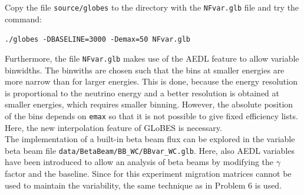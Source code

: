 \documentclass[12pt,a4paper]{article}
\theoremstyle{dotless}
\begin{document}
Copy the file {\tt source/globes} to the directory with the {\tt NFvar.glb} file and try the
command:
\begin{center}
{\tt ./globes -DBASELINE=3000 -Demax=50 NFvar.glb}
\end{center}

Furthermore, the file {\tt NFvar.glb} makes use of the AEDL feature to allow variable
binwidths. The binwiths are chosen such that the bins at smaller energies are more narrow than
for larger energies. This is done, because the energy resolution is proportional to the
neutrino energy and a better resolution is obtained at smaller energies, which requires
smaller binning. However, the absolute position of the bins depends on {\tt emax} so that
it is not possible to give fixed efficiency lists. Here, the new interpolation feature
of GLoBES is necessary.\\


The implementation of a built-in beta beam flux can be explored
in the variable beta beam file {\tt data/BetaBeam/BB\_WC/BBvar\_WC.glb}. Here, also AEDL variables have been
introduced to allow an analysis of beta beams by modifying the $\gamma$ factor and the
baseline. Since for this experiment migration matrices cannot be used to maintain the
variability, the same technique as in Problem 6 is used. 
\end{document}
